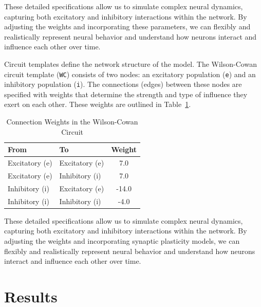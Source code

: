 \documentclass[12pt]{article}
\begin{document}
These detailed specifications allow us to simulate complex neural dynamics, capturing both excitatory and inhibitory interactions within the network. By adjusting the weights and incorporating these parameters, we can flexibly and realistically represent neural behavior and understand how neurons interact and influence each other over time.


Circuit templates define the network structure of the model. The Wilson-Cowan circuit template (\texttt{WC}) consists of two nodes: an excitatory population (\texttt{e}) and an inhibitory population (\texttt{i}). The connections (edges) between these nodes are specified with weights that determine the strength and type of influence they exert on each other. These weights are outlined in Table~\ref{tab:weights}.

\begin{table}[h]
    \centering
    \caption{Connection Weights in the Wilson-Cowan Circuit}
    \label{tab:weights}
    \begin{tabular}{@{}llc@{}}
        \toprule
        \textbf{From} & \textbf{To} & \textbf{Weight} \\ \midrule
        Excitatory (e) & Excitatory (e) & 7.0 \\
        Excitatory (e) & Inhibitory (i) & 7.0 \\
        Inhibitory (i) & Excitatory (e) & -14.0 \\
        Inhibitory (i) & Inhibitory (i) & -4.0 \\ \bottomrule
    \end{tabular}
\end{table}

These detailed specifications allow us to simulate complex neural dynamics, capturing both excitatory and inhibitory interactions within the network. By adjusting the weights and incorporating synaptic plasticity models, we can flexibly and realistically represent neural behavior and understand how neurons interact and influence each other over time.

\section{Results}
\end{document}
